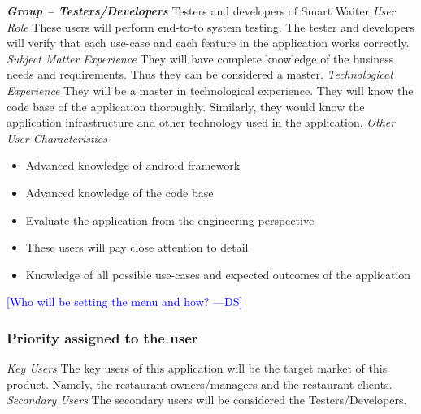 \documentclass[12pt, titlepage]{article}
\newcommand{\authornote}[3]{\textcolor{#1}{[#3 ---#2]}}
\newcommand{\authornote}[3]{}
\newcommand{\ds}[1]{\authornote{blue}{DS}{#1}}
\begin{document}
\noindent\textbf{\textit{Group – Testers/Developers}}\newline
Testers and developers of Smart Waiter \newline
\newline
\textit{User Role}\newline
These users will perform end-to-to system testing. The tester and developers will verify that each use-case and each feature in the application works correctly. \newline\newline
\textit{Subject Matter Experience}\newline
They will have complete knowledge of the business needs and requirements. Thus they can be considered a master. \newline\newline
\textit{Technological Experience}\newline
They will be a master in technological experience. They will know the code base of the application thoroughly. Similarly, they would know the application infrastructure and other technology used in the application. \newline\newline
\textit{Other User Characteristics}
\begin{itemize}
  \item Advanced knowledge of android framework
  \item Advanced knowledge of the code base
  \item 	Evaluate the application from the engineering perspective
  \item 	These users will pay close attention to detail
  \item 	Knowledge of all possible use-cases and expected outcomes of the application
\end{itemize}

\ds{Who will be setting the menu and how?}

\subsubsection{Priority assigned to the user}
\textit{Key Users }\newline
The key users of this application will be the target market of this product. Namely, the restaurant owners/managers and the restaurant clients.\newline
\newline
\textit{Secondary Users}\newline
The secondary users will be considered the Testers/Developers.
\newline
\end{document}
